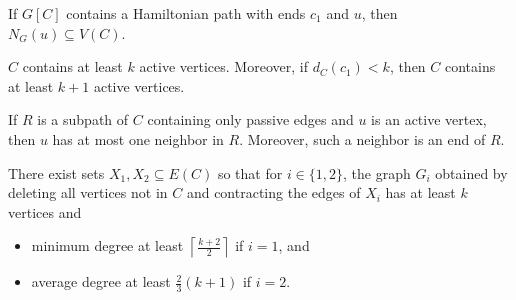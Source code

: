 \documentclass[10pt,a4paper]{amsart}
\begin{document}
\begin{lemma}\label{lem:activeneighborhood}
 If $G[C]$ contains a Hamiltonian path with ends $c_1$ and $u$, then $N_G(u) \subseteq V(C)$. 
\end{lemma}

\begin{lemma}\label{lem:kactive}
    $C$ contains at least $k$ active vertices. Moreover, if $d_C(c_1) < k$, then $C$ contains at least $k+1$ active vertices.   
\end{lemma}

\begin{lemma}\label{lem:nonactivepath}
    If $R$ is a subpath of $C$ containing only passive edges and $u$ is an active vertex, then $u$ has at most one neighbor in $R$.  Moreover, such a neighbor is an end of $R$. 
\end{lemma}

\begin{lemma}
    \label{l:contract}
    There exist sets $X_1,X_2\subseteq E(C)$ so that for $i\in\{1,2\}$, the graph $G_i$ obtained by deleting all vertices not in $C$ and contracting the edges of $X_i$
    has at least $k$ vertices and
    \begin{itemize}
        \item minimum degree at least $\left\lceil \frac{k+2}{2}\right\rceil$ if $i=1$, and 
        \item average degree at least $\tfrac{2}{3}(k+1)$ if $i=2$.
    \end{itemize}
\end{lemma}
\end{document}
